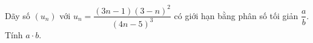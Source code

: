\begin{ex}
Dãy số $(u_n)$ với $u_n=\dfrac{(3n-1)(3-n)^2}{(4n-5)^3}$ có giới hạn bằng phân số tối giản $\dfrac ab$. Tính $a\cdot b$.
\end{ex}
